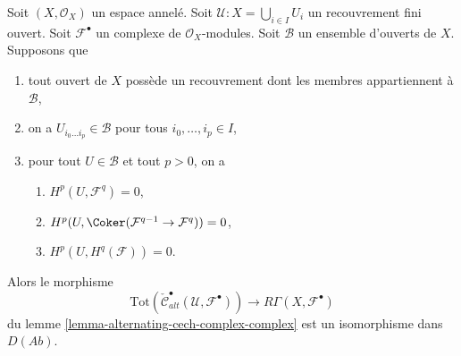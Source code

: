 \begin{lemma}

\label{lemma-alternating-cech-complex-complex-ss}

Soit $(X, \mathcal{O}_X)$ un espace annelé.
Soit $\mathcal{U} : X = \bigcup_{i \in I} U_i$ un recouvrement fini ouvert.
Soit $\mathcal{F}^\bullet$ un complexe de $\mathcal{O}_X$-modules. Soit $\mathcal{B}$ un ensemble d'ouverts de $X$. Supposons que

\begin{enumerate}

\item tout ouvert de $X$ possède un recouvrement dont les membres appartiennent à $\mathcal{B}$,
\item on a $U_{i_0\ldots i_p} \in \mathcal{B}$ pour tous
$i_0, \ldots, i_p \in I$,
\item pour tout $U \in \mathcal{B}$ et tout $p > 0$, on a

\begin{enumerate}

\item  $H^p(U, \mathcal{F}^q) = 0$,
\item  $H^p(U, \Coker(\mathcal{F}^{q - 1} \to \mathcal{F}^q)) = 0$,
\item  $H^p(U, H^q(\mathcal{F})) = 0$.

\end{enumerate}

\end{enumerate}

Alors le morphisme
$$
\text{Tot}(\check{\mathcal{C}}^\bullet_{alt}(\mathcal{U}, \mathcal{F}^\bullet))
\longrightarrow
R\Gamma(X, \mathcal{F}^\bullet)
$$
du lemme \ref{lemma-alternating-cech-complex-complex}
est un isomorphisme dans $D(\textit{Ab})$.

\end{lemma}

